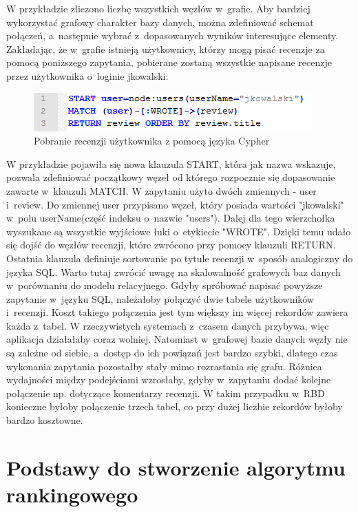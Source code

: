 W przykładzie zliczono liczbę wszystkich węzłów w~grafie. Aby bardziej wykorzystać grafowy charakter bazy danych, można zdefiniować schemat połączeń, a~następnie wybrać z~dopasowanych wyników interesujące elementy. Zakładając, że w~grafie istnieją użytkownicy, którzy mogą pisać recenzje za pomocą poniższego zapytania, pobierane zostaną wszystkie napisane recenzje przez użytkownika o~loginie jkowalski:

\begin{figure}[H]
	\centering
	\includegraphics{images/cypher_q2.png}
	\caption{Pobranie recenzji użytkownika z pomocą języka Cypher}
\end{figure}

W przykładzie pojawiła się nowa klauzula START, która jak nazwa wskazuje, pozwala zdefiniować początkowy węzeł od którego rozpocznie się dopasowanie zawarte w~klauzuli MATCH. W zapytaniu użyto dwóch zmiennych - user i~review. Do zmiennej user przypisano węzeł, który posiada wartości "jkowalski" w~polu userName(część indeksu o~nazwie "users"). Dalej dla tego wierzchołka wyszukane są wszystkie wyjściowe łuki o~etykiecie "WROTE". Dzięki temu udało się dojść do węzłów recenzji, które zwrócono przy pomocy klauzuli RETURN. Ostatnia klauzula definiuje sortowanie po tytule recenzji w~sposób analogiczny do języka SQL. Warto tutaj zwrócić uwagę na skalowalność grafowych baz danych w~porównaniu do modelu relacyjnego. Gdyby spróbować napisać powyższe zapytanie w~języku SQL, należałoby połączyć dwie tabele użytkowników i~recenzji. Koszt takiego połączenia jest tym większy im więcej rekordów zawiera każda z~tabel. W rzeczywistych systemach z~czasem danych przybywa, więc aplikacja działałaby coraz wolniej. Natomiast w~grafowej bazie danych węzły nie są zależne od siebie, a~dostęp do ich powiązań jest bardzo szybki, dlatego czas wykonania zapytania pozostałby stały mimo rozrastania się grafu. Różnica wydajności między podejściami wzrosłaby, gdyby w~zapytaniu dodać kolejne połączenie np. dotyczące komentarzy recenzji. W takim przypadku w~RBD konieczne byłoby połączenie trzech tabel, co przy dużej liczbie rekordów byłoby bardzo kosztowne.


\section{Podstawy do stworzenie algorytmu rankingowego}
\label{sec:algTeotia}

